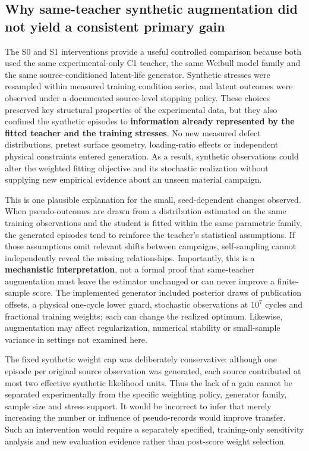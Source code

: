 \documentclass[12pt,a4paper]{article}
\begin{document}
\subsection{Why same-teacher synthetic augmentation did not yield a consistent primary gain}

The S0 and S1 interventions provide a useful controlled comparison because both used the same experimental-only C1 teacher, the same Weibull model family and the same source-conditioned latent-life generator. Synthetic stresses were resampled within measured training condition series, and latent outcomes were observed under a documented source-level stopping policy. These choices preserved key structural properties of the experimental data, but they also confined the synthetic episodes to \textbf{information already represented by the fitted teacher and the training stresses}. No new measured defect distributions, pretest surface geometry, loading-ratio effects or independent physical constraints entered generation. As a result, synthetic observations could alter the weighted fitting objective and its stochastic realization without supplying new empirical evidence about an unseen material campaign.

This is one plausible explanation for the small, seed-dependent changes observed. When pseudo-outcomes are drawn from a distribution estimated on the same training observations and the student is fitted within the same parametric family, the generated episodes tend to reinforce the teacher's statistical assumptions. If those assumptions omit relevant shifts between campaigns, self-sampling cannot independently reveal the missing relationships. Importantly, this is a \textbf{mechanistic interpretation}, not a formal proof that same-teacher augmentation must leave the estimator unchanged or can never improve a finite-sample score. The implemented generator included posterior draws of publication offsets, a physical one-cycle lower guard, stochastic observations at \(10^7\) cycles and fractional training weights; each can change the realized optimum. Likewise, augmentation may affect regularization, numerical stability or small-sample variance in settings not examined here.

The fixed synthetic weight cap was deliberately conservative: although one episode per original source observation was generated, each source contributed at most two effective synthetic likelihood units. Thus the lack of a gain cannot be separated experimentally from the specific weighting policy, generator family, sample size and stress support. It would be incorrect to infer that merely increasing the number or influence of pseudo-records would improve transfer. Such an intervention would require a separately specified, training-only sensitivity analysis and new evaluation evidence rather than post-score weight selection.
\end{document}
